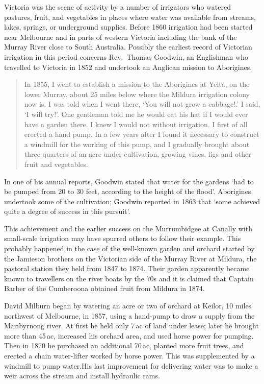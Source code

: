 Victoria was the scene of activity by a number of irrigators who
watered pastures, fruit, and vegetables in places where water was
available from str\-eams, lakes, springs, or underground supplies.
Before 1860 irrigation had been started near Melbourne and in parts of
western Victoria including the bank of the Murray River close to South
Australia.  Possibly the earliest record of Victorian irrigation in
this period concerns Rev.\ Thomas Goodwin, an Englishman who travelled
to Victoria in 1852 and undertook an Anglican mission to
Aborigines.
\begin{quote}
	In 1855, I went to establish a mission to the Aborigines at
	Yelta, on the lower Murray, about 25 miles below where the
	Mildura irrigation colony now is.  I was told when I went
	there, `You will not grow a cabbage!.'  I said, `I will try!'.
	One gentleman told me he would eat his hat if I would ever
	have a garden there.  I knew I would not without irrigation.
	I first of all erected a hand pump.  In a few years after I
	found it necessary to construct a windmill for the working of
	this pump, and I gradually brought about three quarters of an
	acre under cultivation, growing vines, figs and other fruit
	and vegetables.
\end{quote}

In one of his annual reports, Goodwin stated that water for the
gardens `had to be pumped from 20 to 30 feet, according to the height
of the flood'.  Aborigines undertook some of the cultivation; Goodwin
reported in 1863 that `some achieved quite a degree of success in this
pursuit'.

This achievement and the earlier success on the Murrumbidgee at
Canally with small-scale irrigation may have spurred others to follow
their example.  This probably happened in the case of the well-known
garden and orchard started by the Jamieson brothers on the Victorian
side of the Murray River at Mildura, the pastoral station they held
from 1847 to 1874.  Their garden apparently became known to travellers
on the river boats by the 70s and it is claimed that Captain Barber of
the Cumberoona obtained fruit from Mildura in
1874.

David Milburn began by watering an acre or two of orchard at Keilor,
10 miles northwest of Melbourne, in 1857, using a hand-pump to draw a
supply from the Maribyrnong river.  At first he held only 7\,ac of
land under lease; later he brought more than 45\,ac, increased his
orchard area, and used horse power for pumping.  Then in 1870 he
purchased an additional 70\,ac, planted more fruit trees, and erected
a chain water-lifter worked by horse power.  This was supplemented by
a windmill to pump water.His last improvement for delivering
water was to make a weir across the stream and install hydraulic
rams.

